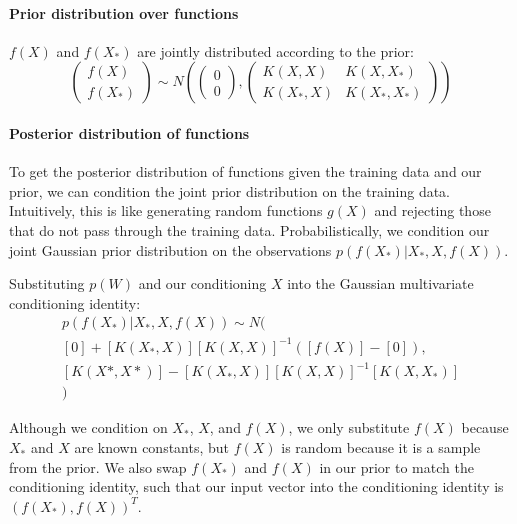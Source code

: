 \paragraph{Prior distribution over functions}
$f(X)$ and $f(X_*)$ are jointly distributed according to the prior:
\begin{equation} \label{eq:joint_prior}
    \begin{pmatrix}
        f(X) \\ f(X_*)
    \end{pmatrix} \sim N\left(
    \begin{pmatrix}
        0 \\ 0
    \end{pmatrix},
    \begin{pmatrix}
        K(X,X) & K(X,X_*) \\ 
        K(X_*,X) & K(X_*,X_*)
    \end{pmatrix}
    \right)
\end{equation}

\paragraph{Posterior distribution of functions}
To get the posterior distribution of functions given the training data and our prior, we can condition the joint prior distribution on the training data. Intuitively, this is like generating random functions $g(X)$ and rejecting those that do not pass through the training data. Probabilistically, we condition our joint Gaussian prior distribution on the observations $p(f(X_*)|X_*, X, f(X))$.

Substituting $p(W)$ and our conditioning $X$ into the Gaussian multivariate conditioning identity:
\begin{equation*}
    \begin{aligned}
        p(f(X_*)|X_*, X, f(X)) \sim N( \\
        [0] + [K(X_*,X)][K(X,X)]^{-1}([f(X)] - [0]), \\
        [K(X*,X*)] - [K(X_*,X)][K(X,X)]^{-1}[K(X,X_*)] \\
        )
    \end{aligned}
\end{equation*}

Although we condition on $X_*$, $X$, and $f(X)$, we only substitute $f(X)$ because $X_*$ and $X$ are known constants, but $f(X)$ is random because it is a sample from the prior. We also swap $f(X_*)$ and $f(X)$ in our prior to match the conditioning identity, such that our input vector into the conditioning identity is $(f(X_*), f(X))^T$.
    
